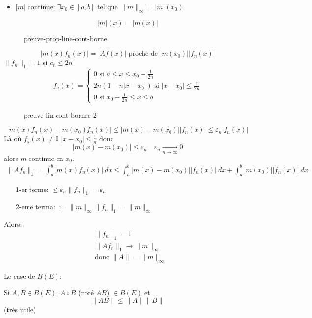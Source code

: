\begin{preuve}
\begin{itemize}
         \item $|m|$ continue:  $\exists x_0 \in [a, b]$ tel que $\|m\|_{\infty} = |m|(x_0)$
    \end{itemize}
    \[
    |m|(x) = |m(x)|
    \] 
\begin{figure}[H]
    \centering
    \caption{preuve-prop-line-cont-borne}
    \label{fig:preuve-prop-line-cont-borne}
\end{figure}
\[
|m(x)f_n(x)| = |Af(x)| \text{ proche de } |m(x_0)| |f_n(x)|
\] 
$\|f_n\|_{1} = 1$ si $c_n \le 2n$
\[
f_n(x) = \begin{cases}
    0 \text{ si } a \le x \le x_0 - \frac{1}{2n}\\
    2n(1 - n|x - x_0|) \text{ si } |x - x_0| \le \frac{1}{2n}\\
    0 \text{ si } x_0 + \frac{1}{2n} \le x \le b
\end{cases}
\] 
\begin{figure}[H]
    \centering
    \caption{preuve-lin-cont-bornee-2}
    \label{fig:preuve-lin-cont-bornee-2}
\end{figure}
\[
|m(x)f_n(x) - m(x_0)f_n(x)| \le |m(x) - m(x_0)| |f_n(x)| \le \varepsilon_n|f_n(x)|
\] 
Là où $f_n(x) \neq 0$ $|x - x_0| \le \frac{1}{n}$ donc 
\[
|m(x) - m(x_0)| \le \varepsilon_n \quad \varepsilon_n \xrightarrow[n \to \infty]{} 0
\] 
alors $m$ continue en  $x_0$.
 \begin{align*}
    \|Af_n\|_{1} = \int_{{a}}^{{b}} {|m(x)f_n(x)|} \: d{x} \le \int_{{a}}^{{b}} {|m(x) - m(x_0)| |f_n(x)|} \: d{x} + \int_{{a}}^{{b}} {|m(x_0)| |f_n(x)|} \: d{x} 
\end{align*}
\begin{itemize}
    \item [1-er terme:] $\le \varepsilon_n\|f_n\|_{1} = \varepsilon_n$
    \item [2-eme terma:] $:= \|m\|_{\infty}\|f_n\|_{1} = \|m\|_{\infty}$
\end{itemize}
Alors:
\begin{align*}
    &\|f_n\|_{1} = 1\\
    &\|Af_n\|_{1} \to \|m\|_{\infty}\\
    &\text{donc } \|A\| = \|m\|_{\infty}
\end{align*}
\end{preuve}
\begin{prop}
   Le case de $B(E)$:
   \par
   Si $A, B \in B(E)$, $A \circ B$ (noté $AB$) $\in B(E)$ et 
   \[
   \|AB\| \le \|A\|\|B\|
   \] 
   (très utile)
\end{prop}
